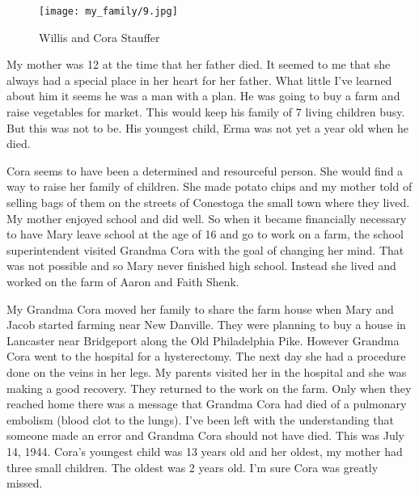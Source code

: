 \begin{figure}
\centering
\texttt{[image: my\_family/9.jpg]}
\caption{Willis and Cora Stauffer}
\label{willis-cora-stauffer}
\end{figure}
My mother was 12 at the time that her father died. 
It seemed to me that she always had a special place in her heart for her father. 
What little I've learned about him it seems he was a man with a plan.
He was going to buy a farm and raise vegetables for market.
This would keep his family of 7 living children busy.
But this was not to be. His youngest child, Erma was not yet a year old when he died. 

Cora seems to have been a determined and resourceful person. She would find a way to raise her family of children. She made potato chips and my mother told of selling bags of them on the streets of Conestoga the small town where they lived.
My mother enjoyed school and did well. 
So when it became financially necessary to have Mary leave school at the age of 16 and go to work on a farm, the school superintendent visited Grandma Cora with the goal of changing her mind. 
That was not possible and so Mary never finished high school. 
Instead she lived and worked on the farm of Aaron and Faith Shenk.

My Grandma Cora moved her family to share the farm house when Mary and Jacob started farming near New Danville.
They were planning to buy a house in Lancaster near Bridgeport along the Old Philadelphia Pike.
However Grandma Cora went to the hospital for a hysterectomy.
The next day she had a procedure done on the veins in her legs.
My parents visited her in the hospital and she was making a good recovery.
They returned to the work on the farm.
Only when they reached home there was a message that Grandma Cora had died of a pulmonary embolism (blood clot to the lungs).
I've been left with the understanding that someone made an error and Grandma Cora should not have died.
This was July 14, 1944.
Cora's youngest child was 13 years old and her oldest, my mother had three small children. 
The oldest was 2 years old. 
I'm sure Cora was greatly missed.

